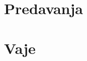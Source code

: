 \documentclass[12pt, a4paper]{article}
\begin{document}
\renewcommand{\headheight}{20pt}
\maketitle
\newpage
\tableofcontents
\newpage


\part{Predavanja}

\part{Vaje}


\newpage
\printindex
\end{document}
